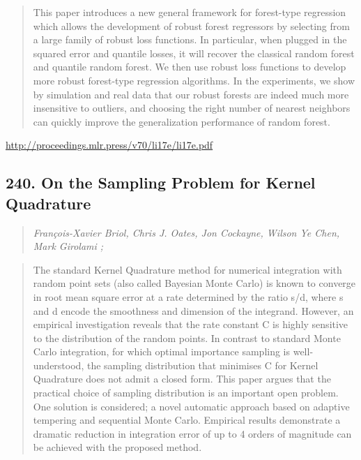 \documentclass{article}
\begin{document}
\begin{quote}
    This paper introduces a new general framework for forest-type regression which allows the development of robust forest regressors by selecting from a large family of robust loss functions. In particular, when plugged in the squared error and quantile losses, it will recover the classical random forest and quantile random forest. We then use robust loss functions to develop more robust forest-type regression algorithms. In the experiments, we show by simulation and real data that our robust forests are indeed much more insensitive to outliers, and choosing the right number of nearest neighbors can quickly improve the generalization performance of random forest.  
\end{quote}

\href{http://proceedings.mlr.press/v70/li17e/li17e.pdf}{http://proceedings.mlr.press/v70/li17e/li17e.pdf}

\subsection{240. On the Sampling Problem for Kernel Quadrature}

\begin{quote}
\footnotesize{\textit{François-Xavier Briol, Chris J. Oates, Jon Cockayne, Wilson Ye Chen, Mark Girolami ;}}

\end{quote}

\begin{quote}
    The standard Kernel Quadrature method for numerical integration with random point sets (also called Bayesian Monte Carlo) is known to converge in root mean square error at a rate determined by the ratio s/d, where s and d encode the smoothness and dimension of the integrand. However, an empirical investigation reveals that the rate constant C is highly sensitive to the distribution of the random points. In contrast to standard Monte Carlo integration, for which optimal importance sampling is well-understood, the sampling distribution that minimises C for Kernel Quadrature does not admit a closed form. This paper argues that the practical choice of sampling distribution is an important open problem. One solution is considered; a novel automatic approach based on adaptive tempering and sequential Monte Carlo. Empirical results demonstrate a dramatic reduction in integration error of up to 4 orders of magnitude can be achieved with the proposed method.  
\end{quote}
\end{document}
